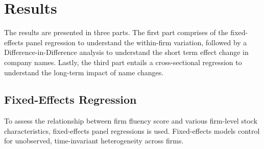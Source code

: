 \documentclass[a4paper,11pt]{report}
\begin{document}
\chapter{Results} \label{sec:results}
The results are presented in three parts. The first part comprises of the fixed-effects panel regression to understand the within-firm variation, followed by a Difference-in-Difference analysis to understand the short term effect change in company names. Lastly, the third part entails a cross-sectional regression to understand the long-term impact of name changes. 
\section{Fixed-Effects Regression}
To assess the relationship between firm fluency score and various firm-level stock characteristics, fixed-effects panel regressions is used. Fixed-effects models control for unobserved, time-invariant heterogeneity across firms.
\end{document}

